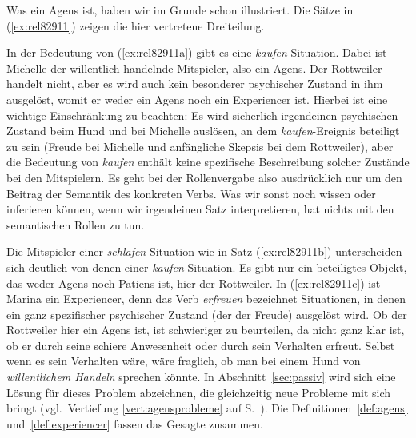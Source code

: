 Was ein Agens ist, haben wir im Grunde schon illustriert.
Die Sätze in (\ref{ex:rel82911}) zeigen die hier vertretene Dreiteilung.

\begin{exe}
  \ex\label{ex:rel82911} 
  \begin{xlist}
  \end{xlist}
\end{exe}

In der Bedeutung von (\ref{ex:rel82911a}) gibt es eine \textit{kaufen}-Situation.
Dabei ist Michelle der willentlich handelnde Mitspieler, also ein Agens.
Der Rottweiler handelt nicht, aber es wird auch kein besonderer psychischer Zustand in ihm ausgelöst, womit er weder ein Agens noch ein Experiencer ist.
Hierbei ist eine wichtige Einschränkung zu beachten: Es wird sicherlich irgendeinen psychischen Zustand beim Hund und bei Michelle auslösen, an dem \textit{kaufen}-Ereignis beteiligt zu sein (\zB Freude bei Michelle und anfängliche Skepsis bei dem Rottweiler), aber die Bedeutung von \textit{kaufen} enthält keine spezifische Beschreibung solcher Zustände bei den Mitspielern.
Es geht bei der Rollenvergabe also ausdrücklich nur um den Beitrag der Semantik des konkreten Verbs.
Was wir sonst noch wissen oder inferieren können, wenn wir irgendeinen Satz interpretieren, hat nichts mit den semantischen Rollen zu tun.

Die Mitspieler einer \textit{schlafen}-Situation wie in Satz (\ref{ex:rel82911b}) unterscheiden sich deutlich von denen einer \textit{kaufen}-Situation.
Es gibt nur ein beteiligtes Objekt, das weder Agens noch Patiens ist, hier der Rottweiler.
In (\ref{ex:rel82911c}) ist Marina ein Experiencer, denn das Verb \textit{erfreuen} bezeichnet Situationen, in denen ein ganz spezifischer psychischer Zustand (der der Freude) ausgelöst wird.
Ob der Rottweiler hier ein Agens ist, ist schwieriger zu beurteilen, da nicht ganz klar ist, ob er durch seine schiere Anwesenheit oder durch sein Verhalten erfreut.
Selbst wenn es sein Verhalten wäre, wäre fraglich, ob man bei einem Hund von \textit{willentlichem Handeln} sprechen könnte.
In Abschnitt~\ref{sec:passiv} wird sich eine Lösung für dieses Problem abzeichnen, die gleichzeitig neue Probleme mit sich bringt (vgl.\ Vertiefung \ref{vert:agensprobleme} auf S.~\pageref{vert:agensprobleme}).
Die Definitionen~\ref{def:agens} und~\ref{def:experiencer} fassen das Gesagte zusammen.


